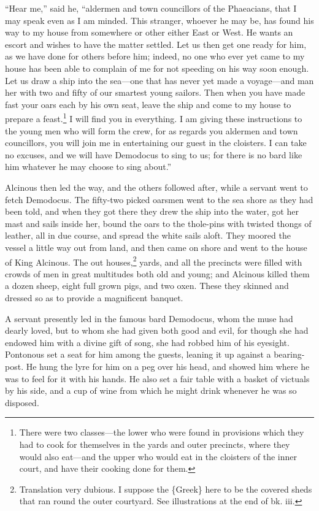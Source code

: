 “Hear me,” said he, “aldermen and town councillors of the Phaeacians, that I
may speak even as I am minded. This stranger, whoever he may be, has found his
way to my house from somewhere or other either East or West. He wants an escort
and wishes to have the matter settled. Let us then get one ready for him, as we
have done for others before him; indeed, no one who ever yet came to my house
has been able to complain of me for not speeding on his way soon enough. Let us
draw a ship into the sea—one that has never yet made a voyage—and man her with
two and fifty of our smartest young sailors. Then when you have made fast your
oars each by his own seat, leave the ship and come to my house to prepare a
feast.\footnote{There were two classes—the lower who were found in provisions which they had
to cook for themselves in the yards and outer precincts, where they would also
eat—and the upper who would eat in the cloisters of the inner court, and have
their cooking done for them.} I will
find you in everything. I am giving these instructions to the young men who
will form the crew, for as regards you aldermen and town councillors, you will
join me in entertaining our guest in the cloisters. I can take no excuses, and
we will have Demodocus to sing to us; for there is no bard like him whatever he
may choose to sing about.”

Alcinous then led the way, and the others followed after, while a servant went
to fetch Demodocus. The fifty-two picked oarsmen went to the sea shore as they
had been told, and when they got there they drew the ship into the water, got
her mast and sails inside her, bound the oars to the thole-pins with twisted
thongs of leather, all in due course, and spread the white sails aloft. They
moored the vessel a little way out from land, and then came on shore and went
to the house of King Alcinous. The out houses,\footnote{Translation very dubious. I suppose the \{Greek\} here to be the covered sheds
that ran round the outer courtyard. See illustrations at the end of bk. iii.} yards, and all the precincts were
filled with crowds of men in great multitudes both old and young; and Alcinous
killed them a dozen sheep, eight full grown pigs, and two oxen. These they
skinned and dressed so as to provide a magnificent banquet.

A servant presently led in the famous bard Demodocus, whom the muse had dearly
loved, but to whom she had given both good and evil, for though she had endowed
him with a divine gift of song, she had robbed him of his eyesight. Pontonous
set a seat for him among the guests, leaning it up against a bearing-post. He
hung the lyre for him on a peg over his head, and showed him where he was to
feel for it with his hands. He also set a fair table with a basket of victuals
by his side, and a cup of wine from which he might drink whenever he was so
disposed.

